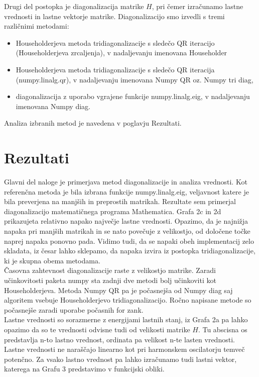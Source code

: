 \documentclass[12pt, a4paper]{article}
\begin{document}
Drugi del postopka je diagonalizacija matrike $H$, pri čemer izračunamo lastne vrednosti in lastne vektorje matrike. Diagonalizacijo smo izvedli s tremi različnimi metodami:
\begin{itemize}
  \item Householderjeva metoda tridiagonalizacije s sledečo QR iteracijo (Householderjeva zrcaljenja), 
  v nadaljevanju imenovana Householder
  \item Householderjeva metoda tridiagonalizacije s sledečo QR iteracija ({\sc numpy.\-linalg.qr}), 
  v nadaljevanju imenovana Numpy QR oz. Numpy tri diag,
  \item diagonalizacija z uporabo vgrajene funkcije {\sc numpy.linalg.eig}, 
  v nadaljevanju imenovana Numpy diag.
\end{itemize} 
Analiza izbranih metod je navedena v poglavju Rezultati.

\section{Rezultati}
  
Glavni del naloge je primerjava metod diagonalizacije in analiza vrednosti. Kot referenčna metoda je bila izbrana funkcije {\sc numpy.linalg.eig}, veljavnost katere je bila preverjena na manjših in preprostih matrikah. Rezultate sem primerjal diagonalizacijo matematičnega programa Mathematica. Grafa 2c in 2d prikazujeta relativno napako največje lastne vrednosti. Opazimo, da je najnižja napaka pri manjših matrikah in se nato povečuje z velikostjo, od določene točke naprej napaka ponovno pada. Vidimo tudi, da se napaki obeh implementacij zelo skladata, iz česar lahko sklepamo, da napaka izvira iz postopka tridiagonalizacije, ki je skupna obema metodama.\\

Časovna zahtevnost diagonalizacije raste z velikostjo matrike. Zaradi učinkovitosti paketa {\sc numpy} sta zadnji dve metodi bolj učinkoviti kot Householderjeva. Metoda Numpy QR pa je počasnejša od Numpy diag saj algoritem vsebuje Householderjevo tridiagonalizacijo. Ročno napisane metode so počasnejše zaradi uporabe počasnih for zank.\\

Lastne vrednosti so sorazmerne z energijami lastnih stanj, iz Grafa 2a pa lahko opazimo da so te vrednosti odvisne tudi od velikosti matrike $H$. Tu abscisna os predstavlja n-to lastno vrednost, ordinata pa velikost n-te lasten vrednosti. Lastne vrednosti ne naraščajo linearno kot pri harmonskem oscilatorju temveč potenčno. Za vsako lastno vrednost pa lahko izračunamo tudi lastni vektor, katerega na Grafu 3 predstavimo v funkcijski obliki.\\
\end{document}
